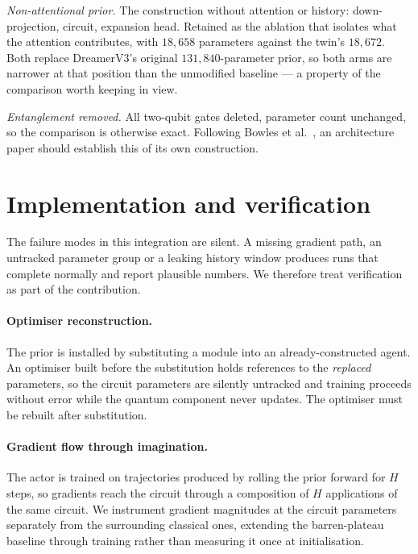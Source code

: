 \documentclass[11pt,onecolumn]{article}
\begin{document}
\emph{Non-attentional prior.} The construction without attention or
history: down-projection, circuit, expansion head. Retained as the
ablation that isolates what the attention contributes, with
$18{,}658$ parameters against the twin's $18{,}672$. Both replace
DreamerV3's original $131{,}840$-parameter prior, so both arms are
narrower at that position than the unmodified baseline --- a property of
the comparison worth keeping in view.

\emph{Entanglement removed.} All two-qubit gates deleted, parameter
count unchanged, so the comparison is otherwise exact. Following
Bowles et al.~\cite{bowles2024}, an architecture paper should establish
this of its own construction.

\section{Implementation and verification}\label{sec:impl}
The failure modes in this integration are silent. A missing gradient
path, an untracked parameter group or a leaking history window produces
runs that complete normally and report plausible numbers. We therefore
treat verification as part of the contribution.

\paragraph{Optimiser reconstruction.}
The prior is installed by substituting a module into an
already-constructed agent. An optimiser built before the substitution
holds references to the \emph{replaced} parameters, so the circuit
parameters are silently untracked and training proceeds without error
while the quantum component never updates. The optimiser must be rebuilt
after substitution.

\paragraph{Gradient flow through imagination.}
The actor is trained on trajectories produced by rolling the prior
forward for $H$ steps, so gradients reach the circuit through a
composition of $H$ applications of the same circuit. We instrument
gradient magnitudes at the circuit parameters separately from the
surrounding classical ones, extending the barren-plateau baseline
through training rather than measuring it once at initialisation.
\end{document}
